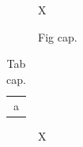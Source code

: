 \documentclass{article}
\begin{document}
\begin{figure}X\caption{Fig cap.}\end{figure}
\begin{table}\caption{Tab cap.}\centering\begin{tabular}{c}a\end{tabular}\end{table}
\begin{figure}X\end{figure}
\end{document}
